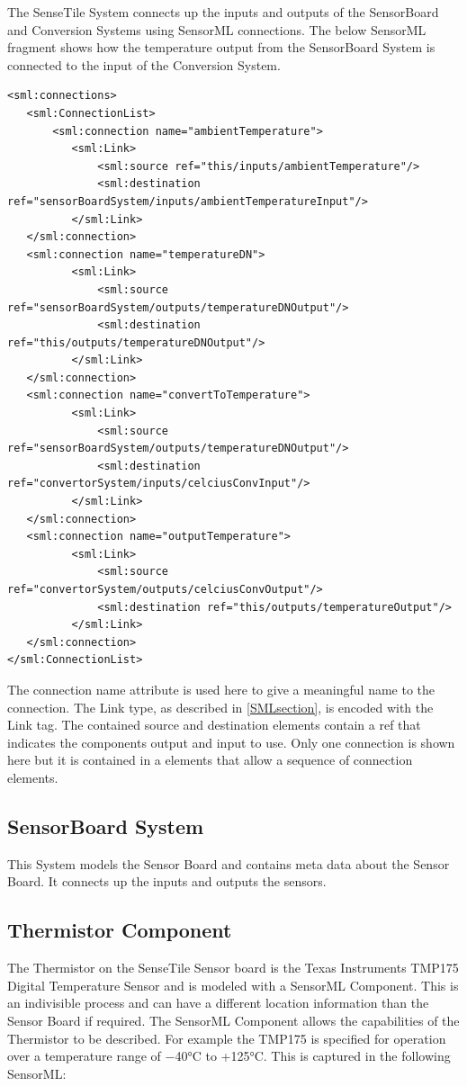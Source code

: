 \documentclass[]{final_report}
\begin{document}
The SenseTile System connects up the inputs and outputs of the SensorBoard and Conversion Systems using SensorML connections. The below SensorML fragment shows how the temperature output from the SensorBoard System is connected to the input of the Conversion System.

\begin{lstlisting}
<sml:connections>
   <sml:ConnectionList>
       <sml:connection name="ambientTemperature">
          <sml:Link>
              <sml:source ref="this/inputs/ambientTemperature"/>
              <sml:destination ref="sensorBoardSystem/inputs/ambientTemperatureInput"/>
          </sml:Link>
   </sml:connection>
   <sml:connection name="temperatureDN">
          <sml:Link>
              <sml:source ref="sensorBoardSystem/outputs/temperatureDNOutput"/>
              <sml:destination ref="this/outputs/temperatureDNOutput"/>
          </sml:Link>
   </sml:connection>
   <sml:connection name="convertToTemperature">
          <sml:Link>
              <sml:source ref="sensorBoardSystem/outputs/temperatureDNOutput"/>
              <sml:destination ref="convertorSystem/inputs/celciusConvInput"/>
          </sml:Link>
   </sml:connection>
   <sml:connection name="outputTemperature">
          <sml:Link>
              <sml:source ref="convertorSystem/outputs/celciusConvOutput"/>
              <sml:destination ref="this/outputs/temperatureOutput"/>
          </sml:Link>
   </sml:connection>
</sml:ConnectionList>
\end{lstlisting}

The connection name attribute is used here to give a meaningful name to the connection. The Link type, as described in \ref{SMLsection}, is encoded with the Link tag. The contained source and destination elements contain a ref that indicates the components output and input to use. Only one connection is shown here but it is contained in a elements that allow a sequence of connection elements. 
  
\subsection{SensorBoard System}

This System models the Sensor Board and contains meta data about the Sensor Board. It connects up the inputs and outputs the sensors.

\subsection{Thermistor Component}
The Thermistor on the SenseTile Sensor board is the Texas Instruments TMP175 Digital Temperature Sensor and is modeled with a SensorML Component. This is an indivisible process and can have a different location information than the Sensor Board if required. The SensorML Component allows the capabilities of the Thermistor to be described. For example the TMP175 is  specified for operation over a temperature range of −40°C to +125°C. This is captured in the following SensorML:
\end{document}
